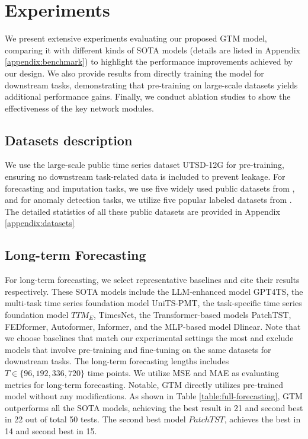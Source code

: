 \section{Experiments}
\label{sec:exp}
We present extensive experiments evaluating our proposed GTM model, comparing it with different kinds of SOTA models (details are listed in Appendix \ref{appendix:benchmark}) to highlight the performance improvements achieved by our design. We also provide results from directly training the model for downstream tasks, demonstrating that pre-training on large-scale datasets yields additional performance gains. Finally, we conduct ablation studies to show the effectiveness of the key network modules.





\subsection{Datasets description}
We use the large-scale public time series dataset UTSD-12G for pre-training, ensuring no downstream task-related data is included to prevent leakage. 
For forecasting and imputation tasks, we use five widely used public datasets from \cite{Wu21}, and for anomaly detection tasks, we utilize five popular labeled datasets from \cite{Su19, Hundman18, Mathur16, Abdulaal21}.
The detailed statistics of all these public datasets are provided in Appendix \ref{appendix:datasets}




\subsection{Long-term Forecasting}
\label{sec:exp-forecasting}
For long-term forecasting, we select representative baselines and cite their results respectively. These SOTA models include the LLM-enhanced model GPT4TS\cite{Zhou23}, the multi-task time series foundation model UniTS-PMT\cite{gao24}, the task-specific time series foundation model $TTM_E$, TimesNet\cite{Ekambaram24, Wu23}, the Transformer-based models PatchTST, FEDformer, Autoformer, Informer\cite{Nie23, Zhou22, Wu21, Zhou21}, and the MLP-based model Dlinear\cite{Zeng23}.
Note that we choose baselines that match our experimental settings the most and exclude models that involve pre-training and fine-tuning on the same datasets for downstream tasks. The long-term forecasting lengths includes $T\in \{96, 192, 336, 720\}$ time points. We utilize MSE and MAE as evaluating metrics for long-term forecasting. Notable, GTM directly utilizes pre-trained model without any modifications. As shown in Table \ref{table:full-forecasting}, GTM outperforms all the SOTA models, achieving the best result in 21 and second best in 22 out of total 50 tests. The second best model $PatchTST$, achieves the best in 14 and second best in 15.  

